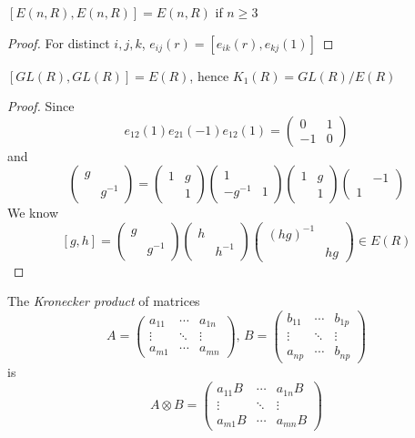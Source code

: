 \documentclass[main]{subfiles}
\begin{document}
\begin{lemma}\label{E(n,R) is perfect}
$[E(n,R),E(n,R)]=E(n,R)$ if $n\geq3$
\end{lemma}

\begin{proof}
For distinct $i,j,k$, $e_{ij}(r)=[e_{ik}(r),e_{kj}(1)]$
\end{proof}

\begin{theorem}\label{Whitehead's lemma}
$[GL(R),GL(R)]=E(R)$, hence $K_1(R)=GL(R)/E(R)$
\end{theorem}

\begin{proof}
Since
\[e_{12}(1)e_{21}(-1)e_{12}(1)=\begin{pmatrix}
0&1 \\
-1&0
\end{pmatrix}\]
and
\[\begin{pmatrix}
g&\\
&g^{-1}
\end{pmatrix}=\begin{pmatrix}
1&g\\
&1
\end{pmatrix}\begin{pmatrix}
1&\\
-g^{-1}&1
\end{pmatrix}\begin{pmatrix}
1&g\\
&1
\end{pmatrix}\begin{pmatrix}
&-1\\
1&
\end{pmatrix}\]
We know
\[[g,h]=\begin{pmatrix}
g&\\
&g^{-1}
\end{pmatrix}
\begin{pmatrix}
h&\\
&h^{-1}
\end{pmatrix}
\begin{pmatrix}
(hg)^{-1}&\\
&hg
\end{pmatrix}\in E(R)\]
\end{proof}

\begin{definition}
The \textit{Kronecker product} of matrices
\[A=\begin{pmatrix}
a_{11} &\cdots &a_{1n} \\
\vdots & \ddots &\vdots \\
a_{m1} &\cdots &a_{mn}
\end{pmatrix},\,B=\begin{pmatrix}
b_{11} &\cdots &b_{1p} \\
\vdots & \ddots &\vdots \\
a_{np} &\cdots &b_{np}
\end{pmatrix}\]
is
\[A\otimes B=
\begin{pmatrix}
a_{11}B &\cdots &a_{1n}B \\
\vdots & \ddots &\vdots \\
a_{m1}B &\cdots &a_{mn}B
\end{pmatrix}\]
\end{definition}
\end{document}
